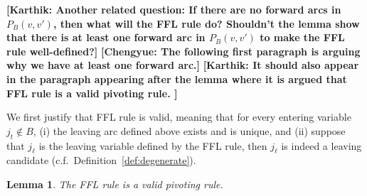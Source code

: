 \documentclass[11pt]{article}
\newcommand{\knote}[1]{{\bf{\color{blue}[\tiny Karthik: #1]}}}
\newcommand{\cnote}[1]{{\bf{\color{red}[\tiny Chengyue: #1]}}}
\newtheorem{lemma}[theorem]{Lemma}
\begin{document}
\knote{Another related question: If there are no forward arcs in $P_B(v, v')$, then what will the FFL rule do? Shouldn't the lemma show that there is at least one forward arc in $P_B(v, v')$ to make the FFL rule well-defined?} \cnote{The following first paragraph is arguing why we have at least one forward arc.}
\knote{It should also appear in the paragraph appearing after the lemma where it is argued that FFL rule is a valid pivoting rule. }
\fi

We first justify that FFL rule is valid, meaning that for every entering variable $j_t\notin B$, (i) the leaving arc defined above exists and is unique, and (ii) suppose that $j_\ell$ is the leaving variable defined by the FFL rule, then $j_\ell$ is indeed a leaving candidate (c.f.~Definition~\ref{def:degenerate}).

\begin{lemma}\label{lem:FFL-well-defined}
    The FFL rule is a valid pivoting rule.
\end{lemma}
\end{document}
